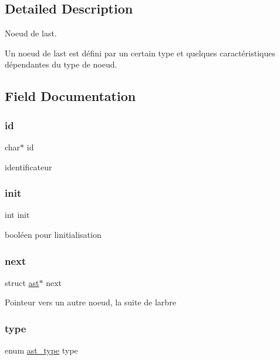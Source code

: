\subsection{Detailed Description}
Noeud de l\textquotesingle{}ast. 

Un noeud de l\textquotesingle{}ast est défini par un certain type et quelques caractéristiques dépendantes du type de noeud. 

\subsection{Field Documentation}
\mbox{\label{structast_aecb3b0d045ada529257a2fbf8f829599}} 
\subsubsection{\texorpdfstring{id}{id}}
{\footnotesize\ttfamily char$\ast$ id}

identificateur \mbox{\label{structast_a795ea50921b36311ffd5e7baa2ef1f7e}} 
\subsubsection{\texorpdfstring{init}{init}}
{\footnotesize\ttfamily int init}

booléen pour l\textquotesingle{}initialisation \mbox{\label{structast_ae48f04f7acec87ecf7f0bc953cb56bf4}} 
\subsubsection{\texorpdfstring{next}{next}}
{\footnotesize\ttfamily struct \hyperlink{structast}{ast}$\ast$ next}

Pointeur vers un autre noeud, la suite de l\textquotesingle{}arbre \mbox{\label{structast_ac332bc7c73f2f41826e84e908db475dc}} 
\subsubsection{\texorpdfstring{type}{type}}
{\footnotesize\ttfamily enum \hyperlink{ast_8h_a77091c187ac9a89404fac2e8226daef3}{ast\+\_\+type} type}

